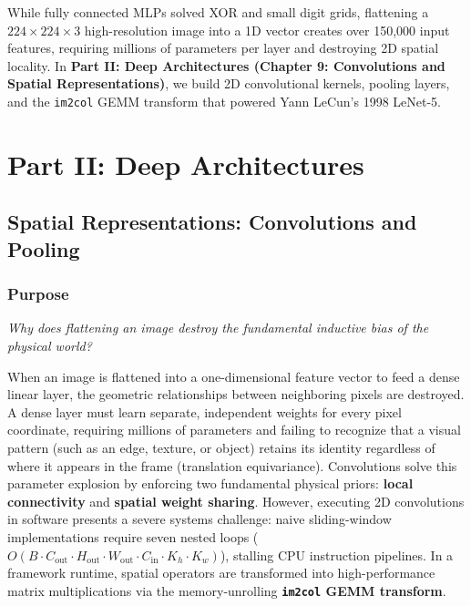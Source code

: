 \documentclass[
  letterpaper,
]{scrbook}
\begin{document}
While fully connected MLPs solved XOR and small digit grids, flattening
a \(224 \times 224 \times 3\) high-resolution image into a 1D vector
creates over 150,000 input features, requiring millions of parameters
per layer and destroying 2D spatial locality. In \textbf{Part II: Deep
Architectures (Chapter 9: Convolutions and Spatial Representations)}, we
build 2D convolutional kernels, pooling layers, and the \texttt{im2col}
GEMM transform that powered Yann LeCun's 1998 LeNet-5.

\part{Part II: Deep Architectures}

\chapter{Spatial Representations: Convolutions and
Pooling}\label{spatial-representations-convolutions-and-pooling}

\section*{Purpose}\label{purpose-10}


\emph{Why does flattening an image destroy the fundamental inductive
bias of the physical world?}

When an image is flattened into a one-dimensional feature vector to feed
a dense linear layer, the geometric relationships between neighboring
pixels are destroyed. A dense layer must learn separate, independent
weights for every pixel coordinate, requiring millions of parameters and
failing to recognize that a visual pattern (such as an edge, texture, or
object) retains its identity regardless of where it appears in the frame
(translation equivariance). Convolutions solve this parameter explosion
by enforcing two fundamental physical priors: \textbf{local
connectivity} and \textbf{spatial weight sharing}. However, executing 2D
convolutions in software presents a severe systems challenge: naive
sliding-window implementations require seven nested loops
(\(O(B \cdot C_{\text{out}} \cdot H_{\text{out}} \cdot W_{\text{out}} \cdot C_{\text{in}} \cdot K_h \cdot K_w)\)),
stalling CPU instruction pipelines. In a framework runtime, spatial
operators are transformed into high-performance matrix multiplications
via the memory-unrolling \textbf{\texttt{im2col} GEMM transform}.
\end{document}
